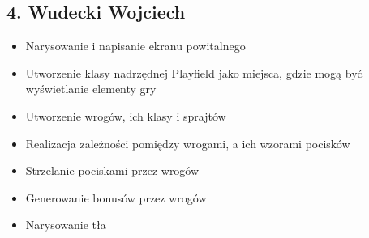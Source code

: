 \documentclass[a4paper,twoside]{article}
\begin{document}
		\subsection*{4. Wudecki Wojciech}
			\begin{itemize}
				\item Narysowanie i napisanie ekranu powitalnego
				\item Utworzenie klasy nadrzędnej Playfield jako miejsca, gdzie mogą być wyświetlanie elementy gry
				\item Utworzenie wrogów, ich klasy i sprajtów
				\item Realizacja zależności pomiędzy wrogami, a ich wzorami pocisków
				\item Strzelanie pociskami przez wrogów
				\item Generowanie bonusów przez wrogów
				\item Narysowanie tła
			\end{itemize}
	
	
	
	
	
	
	
	
	
	
	
	
	
	
	
	
	
	
	
	
\end{document}
